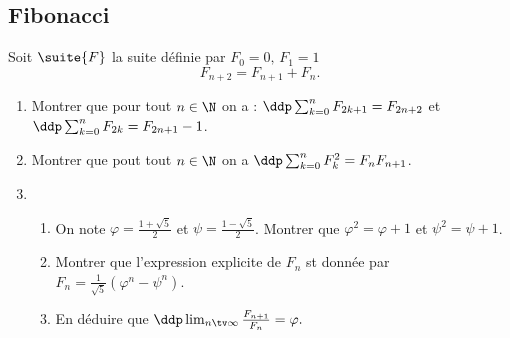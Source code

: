 \subsection{Fibonacci}

\begin{exercice}
Soit $\suite{F}$ la suite définie par $F_0 =0, \, F_1=1 $  
$$ F_{n+2} = F_{n+1} +F_n.$$

\begin{enumerate}
\item Montrer que pour tout $n\in \N$ on a : $\ddp \sum_{k=0}^n F_{2k+1} =F_{2n+2}$
et $\ddp \sum_{k=0}^n F_{2k} =F_{2n+1}-1$.
\item Montrer que pout tout $n\in \N$ on a $\ddp \sum_{k=0}^n F_{k}^2 =F_nF_{n+1}$.
\item \begin{enumerate}
\item On note $\varphi = \frac{1+\sqrt{5}}{2}$ et $\psi=\frac{1-\sqrt{5}}{2}$. Montrer que 
$\varphi^2 =\varphi+1$ et $\psi^2 =\psi+1$.
\item Montrer que l'expression explicite de $F_n$ st donnée par $F_n =\frac{1}{\sqrt{5}}(\varphi^n-\psi^n)$.
\item En déduire que $\ddp \lim_{n\tv \infty} \frac{F_{n+1}}{F_n}=\varphi.$
\end{enumerate}
\end{enumerate}

\end{exercice}


